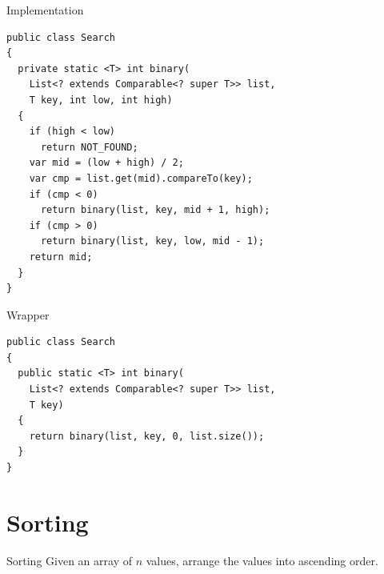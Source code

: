 \documentclass[pdf]{beamer}
\begin{document}
\begin{frame}[fragile]{Implementation}
\begin{verbatim}
public class Search
{
  private static <T> int binary(
    List<? extends Comparable<? super T>> list,
    T key, int low, int high)
  {
    if (high < low)
      return NOT_FOUND;
    var mid = (low + high) / 2;
    var cmp = list.get(mid).compareTo(key);
    if (cmp < 0)
      return binary(list, key, mid + 1, high);
    if (cmp > 0)
      return binary(list, key, low, mid - 1);
    return mid;
  }
}
\end{verbatim}
\end{frame}

\begin{frame}[fragile]{Wrapper}
\begin{verbatim}
public class Search
{
  public static <T> int binary(
    List<? extends Comparable<? super T>> list,
    T key)
  {
    return binary(list, key, 0, list.size());
  }
}
\end{verbatim}
\end{frame}

\section{Sorting}
\begin{frame}{Sorting}\Large
  Given an array of $n$ values, arrange the values into ascending order.
\end{frame}
\end{document}
